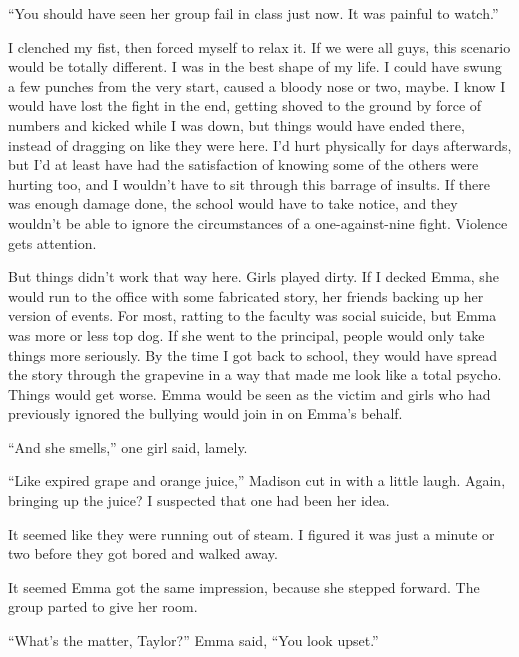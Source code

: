 ``You should have seen her group fail in class just now.  It was painful to watch.''



I clenched my fist, then forced myself to relax it.  If we were all guys, this scenario would be totally different.  I was in the best shape of my life.  I could have swung a few punches from the very start, caused a bloody nose or two, maybe.  I know I would have lost the fight in the end, getting shoved to the ground by force of numbers and kicked while I was down, but things would have ended there, instead of dragging on like they were here.  I'd hurt physically for days afterwards, but I'd at least have had the satisfaction of knowing some of the others were hurting too, and I wouldn't have to sit through this barrage of insults.  If there was enough damage done, the school would have to take notice, and they wouldn't be able to ignore the circumstances of a one-against-nine fight.  Violence gets attention.



But things didn't work that way here.  Girls played dirty.  If I decked Emma, she would run to the office with some fabricated story, her friends backing up her version of events.  For most, ratting to the faculty was social suicide, but Emma was more or less top dog.  If she went to the principal, people would only take things more seriously.  By the time I got back to school, they would have spread the story through the grapevine in a way that made me look like a total psycho.  Things would get worse.  Emma would be seen as the victim and girls who had previously ignored the bullying would join in on Emma's behalf.



``And she smells,'' one girl said, lamely.



``Like expired grape and orange juice,'' Madison cut in with a little laugh.  Again, bringing up the juice?  I suspected that one had been her idea.



It seemed like they were running out of steam.  I figured it was just a minute or two before they got bored and walked away.



It seemed Emma got the same impression, because she stepped forward.  The group parted to give her room.



``What's the matter, Taylor?''  Emma said, ``You look upset.''



